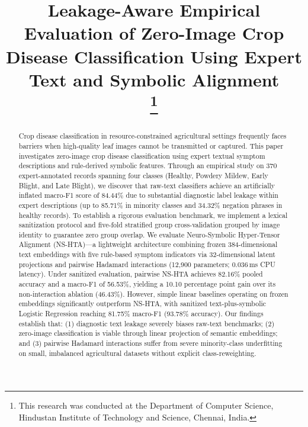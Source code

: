 \documentclass[conference]{IEEEtran}
\begin{document}
\title{Leakage-Aware Empirical Evaluation of Zero-Image Crop Disease Classification Using Expert Text and Symbolic Alignment\\
\thanks{This research was conducted at the Department of Computer Science, Hindustan Institute of Technology and Science, Chennai, India.}
}

\author{
\and
{}
}

\maketitle

\begin{abstract}
Crop disease classification in resource-constrained agricultural settings frequently faces barriers when high-quality leaf images cannot be transmitted or captured. This paper investigates zero-image crop disease classification using expert textual symptom descriptions and rule-derived symbolic features. Through an empirical study on 370 expert-annotated records spanning four classes (Healthy, Powdery Mildew, Early Blight, and Late Blight), we discover that raw-text classifiers achieve an artificially inflated macro-F1 score of 84.44\% due to substantial diagnostic label leakage within expert descriptions (up to 85.71\% in minority classes and 34.32\% negation phrases in healthy records). To establish a rigorous evaluation benchmark, we implement a lexical sanitization protocol and five-fold stratified group cross-validation grouped by image identity to guarantee zero group overlap. We evaluate Neuro-Symbolic Hyper-Tensor Alignment (NS-HTA)---a lightweight architecture combining frozen 384-dimensional text embeddings with five rule-based symptom indicators via 32-dimensional latent projections and pairwise Hadamard interactions (12,900 parameters; 0.036\,ms CPU latency). Under sanitized evaluation, pairwise NS-HTA achieves 82.16\% pooled accuracy and a macro-F1 of 56.53\%, yielding a 10.10 percentage point gain over its non-interaction ablation (46.43\%). However, simple linear baselines operating on frozen embeddings significantly outperform NS-HTA, with sanitized text-plus-symbolic Logistic Regression reaching 81.75\% macro-F1 (93.78\% accuracy). Our findings establish that: (1) diagnostic text leakage severely biases raw-text benchmarks; (2) zero-image classification is viable through linear projection of semantic embeddings; and (3) pairwise Hadamard interactions suffer from severe minority-class underfitting on small, imbalanced agricultural datasets without explicit class-reweighting.
\end{abstract}
\end{document}
